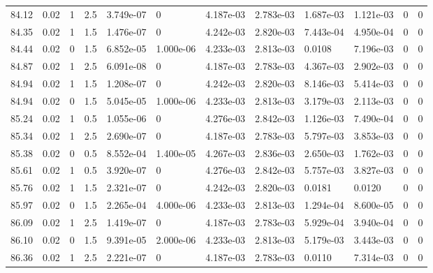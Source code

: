 \documentclass[preview]{standalone}
\begin{document}
{{{{{{{{{{{{\begin{tabular}{L{1.2cm}C{1.2cm} C{0.3cm}C{0.5cm} C{1.4cm}C{1.4cm} C{1.4cm}C{1.4cm} C{1.6cm}C{1.6cm} C{1.6cm}C{1.6cm}}
  84.12  &  0.02  & 1     & 2.5 &  3.749e-07  & 0  &  4.187e-03&   2.783e-03& 1.687e-03 & 1.121e-03   &  0 & 0  \\ 
  84.35  &  0.02  & 1     & 1.5 &  1.476e-07  & 0  &  4.242e-03&   2.820e-03& 7.443e-04 & 4.950e-04   &  0 & 0  \\ 
  84.44  &  0.02  & 0     & 1.5 &  6.852e-05  & 1.000e-06  &  4.233e-03&   2.813e-03& 0.0108 & 7.196e-03   &  0 & 0  \\ 
  84.87  &  0.02  & 1     & 2.5 &  6.091e-08  & 0  &  4.187e-03&   2.783e-03& 4.367e-03 & 2.902e-03   &  0 & 0  \\ 
  84.94  &  0.02  & 1     & 1.5 &  1.208e-07  & 0  &  4.242e-03&   2.820e-03& 8.146e-03 & 5.414e-03   &  0 & 0  \\ 
  84.94  &  0.02  & 0     & 1.5 &  5.045e-05  & 1.000e-06  &  4.233e-03&   2.813e-03& 3.179e-03 & 2.113e-03   &  0 & 0  \\ 
  85.24  &  0.02  & 1     & 0.5 &  1.055e-06  & 0  &  4.276e-03&   2.842e-03& 1.126e-03 & 7.490e-04   &  0 & 0  \\ 
  85.34  &  0.02  & 1     & 2.5 &  2.690e-07  & 0  &  4.187e-03&   2.783e-03& 5.797e-03 & 3.853e-03   &  0 & 0  \\ 
  85.38  &  0.02  & 0     & 0.5 &  8.552e-04  & 1.400e-05  &  4.267e-03&   2.836e-03& 2.650e-03 & 1.762e-03   &  0 & 0  \\ 
  85.61  &  0.02  & 1     & 0.5 &  3.920e-07  & 0  &  4.276e-03&   2.842e-03& 5.757e-03 & 3.827e-03   &  0 & 0  \\ 
  85.76  &  0.02  & 1     & 1.5 &  2.321e-07  & 0  &  4.242e-03&   2.820e-03& 0.0181 & 0.0120   &  0 & 0  \\ 
  85.97  &  0.02  & 0     & 1.5 &  2.265e-04  & 4.000e-06  &  4.233e-03&   2.813e-03& 1.294e-04 & 8.600e-05   &  0 & 0  \\ 
  86.09  &  0.02  & 1     & 2.5 &  1.419e-07  & 0  &  4.187e-03&   2.783e-03& 5.929e-04 & 3.940e-04   &  0 & 0  \\ 
  86.10  &  0.02  & 0     & 1.5 &  9.391e-05  & 2.000e-06  &  4.233e-03&   2.813e-03& 5.179e-03 & 3.443e-03   &  0 & 0  \\ 
  86.36  &  0.02  & 1     & 2.5 &  2.221e-07  & 0  &  4.187e-03&   2.783e-03& 0.0110 & 7.314e-03   &  0 & 0  \\ 
\hline 
\end{tabular} 

}}}}}}}}}}}}
\end{document}
